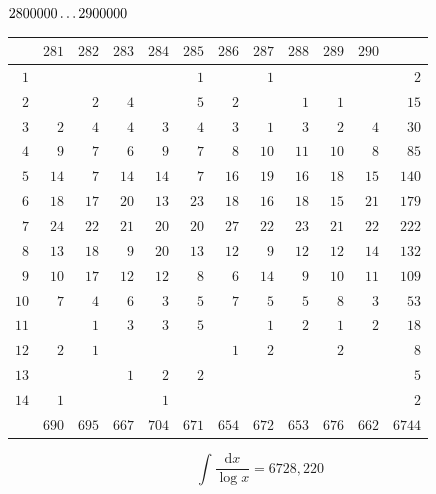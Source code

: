 \clearpage
\noindent\begin{minipage}{\linewidth}\centering
{}
\(2800000\mathinner{.\,.\,.}2900000\)\par\smallskip
\begingroup\fontsize{10.5}{11.5}\selectfont\setlength{\tabcolsep}{3.5pt}\renewcommand{\arraystretch}{1}
\begin{tabular}{r|rrrrrrrrrr|r}\hline
 & $281$ & $282$ & $283$ & $284$ & $285$ & $286$ & $287$ & $288$ & $289$ & $290$ &  \\ \hline
$1$ &  &  &  &  & $1$ &  & $1$ &  &  &  & $2$ \\
$2$ &  & $2$ & $4$ &  & $5$ & $2$ &  & $1$ & $1$ &  & $15$ \\
$3$ & $2$ & $4$ & $4$ & $3$ & $4$ & $3$ & $1$ & $3$ & $2$ & $4$ & $30$ \\
$4$ & $9$ & $7$ & $6$ & $9$ & $7$ & $8$ & $10$ & $11$ & $10$ & $8$ & $85$ \\
$5$ & $14$ & $7$ & $14$ & $14$ & $7$ & $16$ & $19$ & $16$ & $18$ & $15$ & $140$ \\
$6$ & $18$ & $17$ & $20$ & $13$ & $23$ & $18$ & $16$ & $18$ & $15$ & $21$ & $179$ \\
$7$ & $24$ & $22$ & $21$ & $20$ & $20$ & $27$ & $22$ & $23$ & $21$ & $22$ & $222$ \\
$8$ & $13$ & $18$ & $9$ & $20$ & $13$ & $12$ & $9$ & $12$ & $12$ & $14$ & $132$ \\
$9$ & $10$ & $17$ & $12$ & $12$ & $8$ & $6$ & $14$ & $9$ & $10$ & $11$ & $109$ \\
$10$ & $7$ & $4$ & $6$ & $3$ & $5$ & $7$ & $5$ & $5$ & $8$ & $3$ & $53$ \\
$11$ &  & $1$ & $3$ & $3$ & $5$ &  & $1$ & $2$ & $1$ & $2$ & $18$ \\
$12$ & $2$ & $1$ &  &  &  & $1$ & $2$ &  & $2$ &  & $8$ \\
$13$ &  &  & $1$ & $2$ & $2$ &  &  &  &  &  & $5$ \\
$14$ & $1$ &  &  & $1$ &  &  &  &  &  &  & $2$ \\
\hline
 & $690$ & $695$ & $667$ & $704$ & $671$ & $654$ & $672$ & $653$ & $676$ & $662$ & $6744$ \\ \hline
\end{tabular}\par\endgroup
\setlength{\abovedisplayskip}{6pt}\setlength{\belowdisplayskip}{4pt}
\[\int\frac{\mathrm{d}x}{\log x}=6728{,}220\]
\end{minipage}

